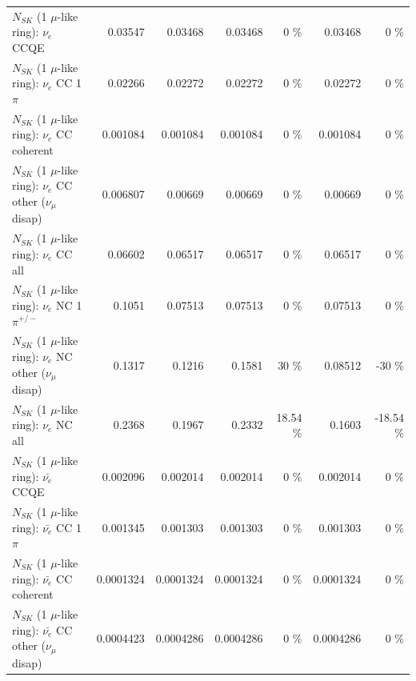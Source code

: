 \begin{table}
\begin{tabular}{| l | r | r | r  r | r  r |}
\hline
\hline
\hline
                                      $N_{SK}$ (1 $\mu$-like ring): $\nu_e$ CCQE &         0.03547 &         0.03468 &         0.03468 &        0 \%  &         0.03468 &        0 \%  \\ 
                                 $N_{SK}$ (1 $\mu$-like ring): $\nu_e$ CC 1$\pi$ &         0.02266 &         0.02272 &         0.02272 &        0 \%  &         0.02272 &        0 \%  \\ 
                               $N_{SK}$ (1 $\mu$-like ring): $\nu_e$ CC coherent &        0.001084 &        0.001084 &        0.001084 &        0 \%  &        0.001084 &        0 \%  \\ 
                $N_{SK}$ (1 $\mu$-like ring): $\nu_e$ CC other ($\nu_\mu$ disap) &        0.006807 &         0.00669 &         0.00669 &        0 \%  &         0.00669 &        0 \%  \\ 
                                  $N_{SK}$ (1 $\mu$-like ring): $\nu_{e}$ CC all &         0.06602 &         0.06517 &         0.06517 &        0 \%  &         0.06517 &        0 \%  \\ 
\hline
                           $N_{SK}$ (1 $\mu$-like ring): $\nu_e$ NC 1$\pi^{+/-}$ &          0.1051 &         0.07513 &         0.07513 &        0 \%  &         0.07513 &        0 \%  \\ 
                $N_{SK}$ (1 $\mu$-like ring): $\nu_e$ NC other ($\nu_\mu$ disap) &          0.1317 &          0.1216 &          0.1581 &       30 \%  &         0.08512 &      -30 \%  \\ 
                                  $N_{SK}$ (1 $\mu$-like ring): $\nu_{e}$ NC all &          0.2368 &          0.1967 &          0.2332 &    18.54 \%  &          0.1603 &   -18.54 \%  \\ 
\hline
\hline
\hline
                                $N_{SK}$ (1 $\mu$-like ring): $\bar{\nu_e}$ CCQE &        0.002096 &        0.002014 &        0.002014 &        0 \%  &        0.002014 &        0 \%  \\ 
                           $N_{SK}$ (1 $\mu$-like ring): $\bar{\nu_e}$ CC 1$\pi$ &        0.001345 &        0.001303 &        0.001303 &        0 \%  &        0.001303 &        0 \%  \\ 
                         $N_{SK}$ (1 $\mu$-like ring): $\bar{\nu_e}$ CC coherent &       0.0001324 &       0.0001324 &       0.0001324 &        0 \%  &       0.0001324 &        0 \%  \\ 
          $N_{SK}$ (1 $\mu$-like ring): $\bar{\nu_e}$ CC other ($\nu_\mu$ disap) &       0.0004423 &       0.0004286 &       0.0004286 &        0 \%  &       0.0004286 &        0 \%  \\ 

\end{tabular}
\end{table}
